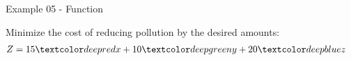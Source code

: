 \begin{frame}{Example 05 - Function}

Minimize the cost of reducing pollution by the desired amounts:
\Huge{
\begin{align*}
    Z &= 15\colora{x} + 10\colorb{y} + 20\colorc{z}
\end{align*}
}

\end{frame}
